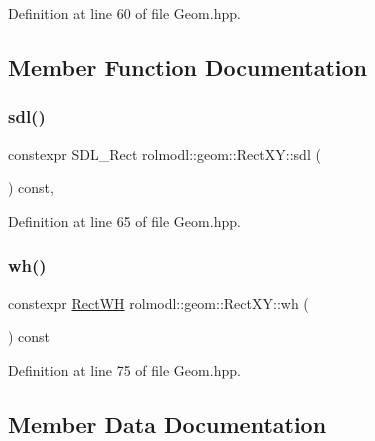 Definition at line 60 of file Geom.\+hpp.



\subsection{Member Function Documentation}
\mbox{\label{structrolmodl_1_1geom_1_1_rect_x_y_aa535506f0b726013a819099528bfdf86}} 
\subsubsection{\texorpdfstring{sdl()}{sdl()}}
{\footnotesize\ttfamily constexpr S\+D\+L\+\_\+\+Rect rolmodl\+::geom\+::\+Rect\+X\+Y\+::sdl (\begin{DoxyParamCaption}{ }\end{DoxyParamCaption}) const\hspace{0.3cm}{\ttfamily [inline]}, {\ttfamily [noexcept]}}



Definition at line 65 of file Geom.\+hpp.

\mbox{\label{structrolmodl_1_1geom_1_1_rect_x_y_ad47180f559f3389a30cda5a05bf686b2}} 
\subsubsection{\texorpdfstring{wh()}{wh()}}
{\footnotesize\ttfamily constexpr \mbox{\hyperlink{structrolmodl_1_1geom_1_1_rect_w_h}{Rect\+WH}} rolmodl\+::geom\+::\+Rect\+X\+Y\+::wh (\begin{DoxyParamCaption}{ }\end{DoxyParamCaption}) const\hspace{0.3cm}{\ttfamily [noexcept]}}



Definition at line 75 of file Geom.\+hpp.



\subsection{Member Data Documentation}
\mbox{\label{structrolmodl_1_1geom_1_1_rect_x_y_ac66d8c9039bc0dedd2a34be448f96ca9}} 
